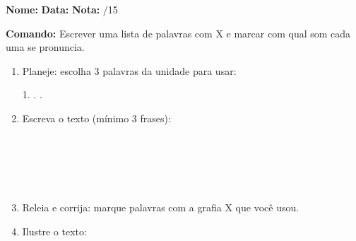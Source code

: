 \begin{exercicio}

\noindent\textbf{Nome:} \underline{\hspace{3.2cm}} \quad \textbf{Data:} \underline{\hspace{1.6cm}} \quad \textbf{Nota:} \underline{\hspace{0.9cm}}/15


\noindent\textbf{Comando:} Escrever uma lista de palavras com X e marcar com qual som cada uma se pronuncia.


\begin{enumerate}

  \item Planeje: escolha 3 palavras da unidade para usar:
  \begin{center}
  1. \underline{\hspace{3cm}} . \underline{\hspace{3cm}} . \underline{\hspace{3cm}}
  \end{center}

  \item Escreva o texto (mínimo 3 frases):
  \begin{center}
  \underline{\hspace{12cm}}\\\underline{\hspace{12cm}}\\\underline{\hspace{12cm}}\\\underline{\hspace{12cm}}\\\underline{\hspace{12cm}}
  \end{center}

  \item Releia e corrija: marque palavras com a grafia X que você usou.

  \item Ilustre o texto:
  \begin{center}
  \end{center}

\end{enumerate}

\end{exercicio}

